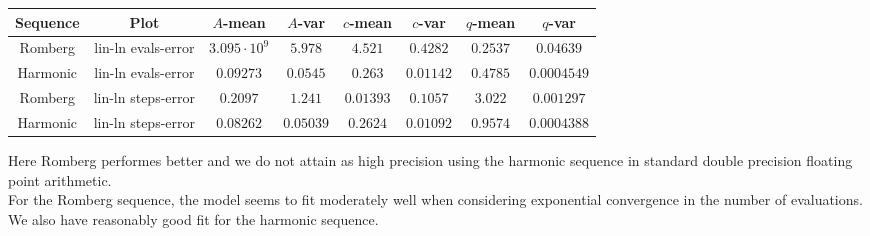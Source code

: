 \begin{table}[H]
    \centering
    \small
    \begin{tabular}{c|c||c|c|c|c|c|c}
Sequence & Plot & \(A\)-mean & \(A\)-var & \(c\)-mean & \(c\)-var & \(q\)-mean & \(q\)-var\\\hline
\rowcolor{red}
Romberg & lin-ln evals-error & \(3.095\cdot 10^9\) & \(5.978\) & \(4.521\) & \(0.4282\) & \(0.2537\) & \(0.04639\) \\
\rowcolor{green}
Harmonic & lin-ln evals-error & \(0.09273\) & \(0.0545\) & \(0.263\) & \(0.01142\) & \(0.4785\) & \(0.0004549\) \\
\rowcolor{green}
Romberg & lin-ln steps-error & \(0.2097\) & \(1.241\) & \(0.01393\) & \(0.1057\) & \(3.022\) & \(0.001297\) \\
\rowcolor{green}
Harmonic & lin-ln steps-error & \(0.08262\) & \(0.05039\) & \(0.2624\) & \(0.01092\) & \(0.9574\) & \(0.0004388\) \\
    \end{tabular}
    \label{tab:my_label}
\end{table}

Here Romberg performes better and we do not attain as high precision using the harmonic sequence in standard double precision floating point arithmetic.\\

For the Romberg sequence, the model seems to fit moderately well when considering exponential convergence in the number of evaluations. We also have reasonably good fit for the harmonic sequence.\\

